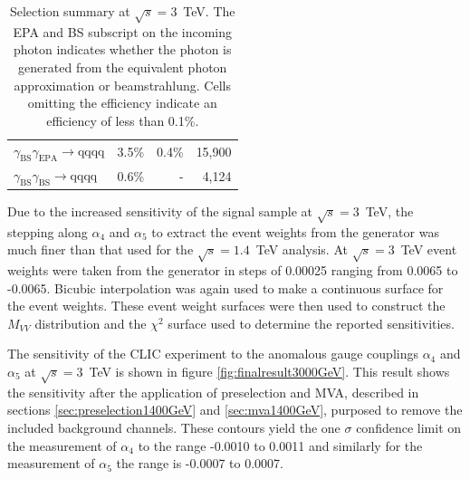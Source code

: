\begin{table}[h!]
\begin{tabular}{ l r r r }
$\gamma_{\text{BS}}\gamma_{\text{EPA}} \rightarrow \text{qqqq}$ & 3.5\% & 0.4\% & 15,900 \\
$\gamma_{\text{BS}}\gamma_{\text{BS}} \rightarrow \text{qqqq}$ & 0.6\% & - & 4,124 \\
\hline
\end{tabular}
\caption[Selection summary at $\sqrt{s}=3$~TeV.  The EPA and BS subscript on the incoming photon indicates whether the photon is generated from the equivalent photon approximation or beamstrahlung.  Cells omitting the efficiency indicate an efficiency of less than 0.1\%.]{Selection summary at $\sqrt{s}=3$~TeV.  The EPA and BS subscript on the incoming photon indicates whether the photon is generated from the equivalent photon approximation or beamstrahlung.  Cells omitting the efficiency indicate an efficiency of less than 0.1\%.}
\label{table:selectionsummary3000GeV}
\end{table}

Due to the increased sensitivity of the signal sample at $\sqrt{s}=3$~TeV, the stepping along $\alpha_{4}$ and $\alpha_{5}$ to extract the event weights from the generator was much finer than that used for the $\sqrt{s}=1.4$~TeV analysis.  At $\sqrt{s}=3$~TeV event weights were taken from the generator in steps of 0.00025 ranging from 0.0065 to -0.0065.  Bicubic interpolation was again used to make a continuous surface for the event weights.  These event weight surfaces were then used to construct the $M_{VV}$ distribution and the $\chi^{2}$ surface used to determine the reported sensitivities.

The sensitivity of the CLIC experiment to the anomalous gauge couplings $\alpha_{4}$ and $\alpha_{5}$ at $\sqrt{s}=3$~TeV is shown in figure \ref{fig:finalresult3000GeV}.  This result shows the sensitivity after the application of preselection and MVA, described in sections \ref{sec:preselection1400GeV} and \ref{sec:mva1400GeV}, purposed to remove the included background channels.  These contours yield the one $\sigma$ confidence limit on the measurement of $\alpha_{4}$ to the range -0.0010 to 0.0011 and similarly for the measurement of $\alpha_{5}$ the range is -0.0007 to 0.0007.

